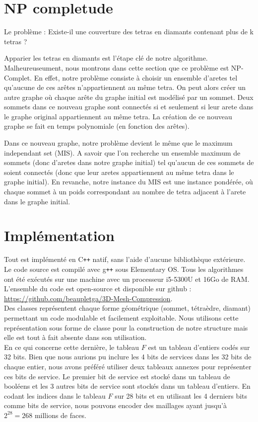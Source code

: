 \documentclass[a4paper,11pt,openany]{article}
\begin{document}
\section{NP completude}
Le problème : Existe-il une couverture des tetras en diamants contenant plus de k tetras ?

Apparier les tetras en diamants est l'étape clé de notre algorithme. Malheureuseument, nous montrons dans cette section que ce problème est NP-Complet.
En effet, notre problème consiste à choisir un ensemble d'aretes tel qu'aucune de ces arêtes n'appartiennent au même tetra.
On peut alors créer un autre graphe où chaque arête du graphe initial est modélisé par un sommet. Deux sommets dans ce nouveau graphe sont connectés si et seulement si leur arete dans le graphe original appartiennent au même tetra.
La création de ce nouveau graphe se fait en temps polynomiale (en fonction des arêtes).

Dans ce nouveau graphe, notre problème devient le même que le maximum independant set (MIS). A savoir que l'on recherche un ensemble maximum de sommets (donc d'aretes dans notre graphe initial) tel qu'aucun de ces sommets de soient connectés (donc que leur aretes appartiennent au même tetra dans le graphe initial).
En revanche, notre instance du MIS est une instance pondérée, où chaque sommet à un poids correspondant au nombre de tetra adjacent à l'arete dans le graphe initial.

\section{Implémentation}
\noindent
Tout est implémenté en C\texttt{++} natif, sans l'aide d'aucune bibliothèque extérieure. Le code source est compilé avec g\texttt{++} sous Elementary OS. Tous les algorithmes ont été exécutés sur une machine avec un processeur i5-5300U et 16Go de RAM. L'ensemble du code est open-source et disponible sur github : \url{https://github.com/beaupletga/3D-Mesh-Compression}.\\
Des classes représentent chaque forme géométrique (sommet, tétraèdre, diamant) permettant un code modulable et facilement exploitable. Nous utilisons cette représentation sous forme de classe pour la construction de notre structure mais elle est tout à fait absente dans son utilisation. \\
En ce qui concerne cette dernière, le tableau $F$ est un tableau d'entiers codés sur 32 bits. Bien que nous aurions pu inclure les 4 bits de services dans les 32 bits de chaque entier, nous avons préféré utiliser deux tableaux annexes pour représenter ces bits de service. Le premier bit de service est stocké dans un tableau de booléens et les 3 autres bits de service sont stockés dans un tableau d'entiers. En codant les indices dans le tableau $F$ sur 28 bits et en utilisant les 4 derniers bits comme bits de service, nous pouvons encoder des maillages ayant jusqu'à $2^{28}=268$ millions de faces.
\end{document}
